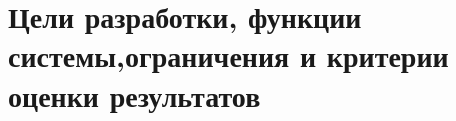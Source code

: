 \documentclass[../nirs.tex]{subfiles}
\begin{document}
\section{Цели разработки, функции системы,ограничения и критерии оценки результатов}
\end{document}

